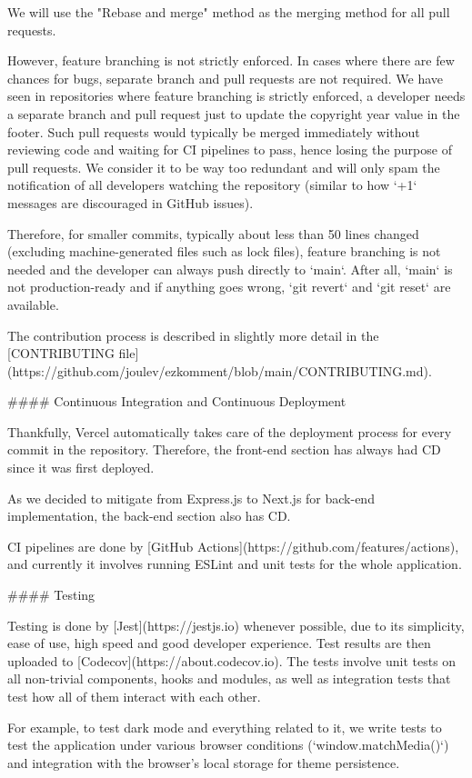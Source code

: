 \documentclass[11pt]{article}
\begin{document}
\begin{markdown}
We will use the "Rebase and merge" method as the merging method for all pull requests.

However, feature branching is not strictly enforced. In cases where there are few chances for bugs, separate branch and pull requests are not required. We have seen in repositories where feature branching is strictly enforced, a developer needs a separate branch and pull request just to update the copyright year value in the footer. Such pull requests would typically be merged immediately without reviewing code and waiting for CI pipelines to pass, hence losing the purpose of pull requests. We consider it to be way too redundant and will only spam the notification of all developers watching the repository (similar to how `+1` messages are discouraged in GitHub issues).

Therefore, for smaller commits, typically about less than 50 lines changed (excluding machine-generated files such as lock files), feature branching is not needed and the developer can always push directly to `main`. After all, `main` is not production-ready and if anything goes wrong, `git revert` and `git reset` are available.

The contribution process is described in slightly more detail in the [CONTRIBUTING file](https://github.com/joulev/ezkomment/blob/main/CONTRIBUTING.md).

#### Continuous Integration and Continuous Deployment

Thankfully, Vercel automatically takes care of the deployment process for every commit in the repository. Therefore, the front-end section has always had CD since it was first deployed.

As we decided to mitigate from Express.js to Next.js for back-end implementation, the back-end section also has CD.

CI pipelines are done by [GitHub Actions](https://github.com/features/actions), and currently it involves running ESLint and unit tests for the whole application.

#### Testing

Testing is done by [Jest](https://jestjs.io) whenever possible, due to its simplicity, ease of use, high speed and good developer experience. Test results are then uploaded to [Codecov](https://about.codecov.io). The tests involve unit tests on all non-trivial components, hooks and modules, as well as integration tests that test how all of them interact with each other.

For example, to test dark mode and everything related to it, we write tests to test the application under various browser conditions (`window.matchMedia()`) and integration with the browser's local storage for theme persistence.


\end{markdown}
\end{document}
